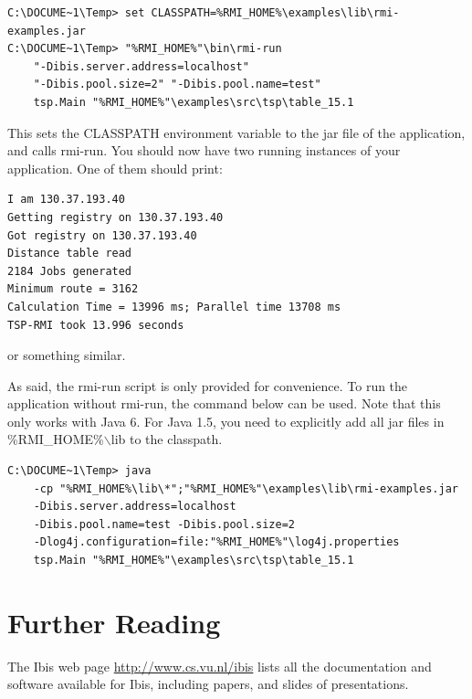 \documentclass[a4paper,10pt]{article}
\begin{document}
\noindent
{\small
\begin{verbatim}
C:\DOCUME~1\Temp> set CLASSPATH=%RMI_HOME%\examples\lib\rmi-examples.jar
C:\DOCUME~1\Temp> "%RMI_HOME%"\bin\rmi-run
    "-Dibis.server.address=localhost"
    "-Dibis.pool.size=2" "-Dibis.pool.name=test"
    tsp.Main "%RMI_HOME%"\examples\src\tsp\table_15.1
\end{verbatim}
}
\noindent

This sets the CLASSPATH environment variable to the jar file of the
application, and calls rmi-run. You should now have two running
instances of your application. One of them should print:

\noindent
{\small
\begin{verbatim}
I am 130.37.193.40
Getting registry on 130.37.193.40
Got registry on 130.37.193.40
Distance table read
2184 Jobs generated
Minimum route = 3162
Calculation Time = 13996 ms; Parallel time 13708 ms
TSP-RMI took 13.996 seconds
\end{verbatim}
}
\noindent

or something similar.

As said, the rmi-run script is only provided for convenience. To run
the application without rmi-run, the command below can be used.
Note that this only works with Java 6. For Java 1.5, you need to
explicitly add all jar files in \%RMI\_HOME\%$\backslash$lib to the classpath.

\noindent
{\small
\begin{verbatim}
C:\DOCUME~1\Temp> java
    -cp "%RMI_HOME%\lib\*";"%RMI_HOME%"\examples\lib\rmi-examples.jar
    -Dibis.server.address=localhost
    -Dibis.pool.name=test -Dibis.pool.size=2
    -Dlog4j.configuration=file:"%RMI_HOME%"\log4j.properties
    tsp.Main "%RMI_HOME%"\examples\src\tsp\table_15.1
\end{verbatim}
}
\noindent

\section{Further Reading}

The Ibis web page \url{http://www.cs.vu.nl/ibis} lists all
the documentation and software available for Ibis, including papers, and
slides of presentations.
\end{document}
